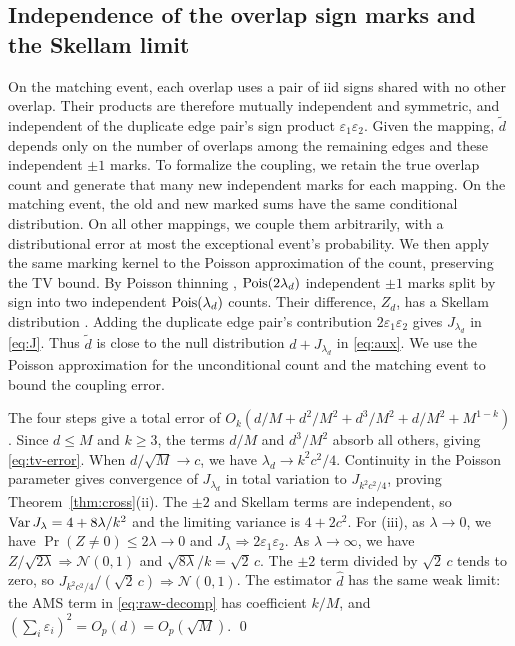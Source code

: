 \subsection{Independence of the overlap sign marks and the Skellam limit}
On the matching event, each overlap uses a pair of iid signs shared with no other overlap. Their products are therefore mutually independent and symmetric, and independent of the duplicate edge pair's sign product $\varepsilon_1\varepsilon_2$. Given the mapping, $\widetilde d$ depends only on the number of overlaps among the remaining edges and these independent $\pm1$ marks. To formalize the coupling, we retain the true overlap count and generate that many new independent marks for each mapping. On the matching event, the old and new marked sums have the same conditional distribution. On all other mappings, we couple them arbitrarily, with a distributional error at most the exceptional event's probability. We then apply the same marking kernel to the Poisson approximation of the count, preserving the TV bound. By Poisson thinning \cite{kingman1993poisson}, $\operatorname{Pois}(2\lambda_d)$ independent $\pm1$ marks split by sign into two independent $\operatorname{Pois}(\lambda_d)$ counts. Their difference, $Z_d$, has a Skellam distribution \cite{skellam1946}. Adding the duplicate edge pair's contribution $2\varepsilon_1\varepsilon_2$ gives $J_{\lambda_d}$ in \eqref{eq:J}. Thus $\widetilde d$ is close to the null distribution $d+J_{\lambda_d}$ in \eqref{eq:aux}. We use the Poisson approximation for the unconditional count and the matching event to bound the coupling error.

The four steps give a total error of $O_k(d/M+d^2/M^2+d^3/M^2+d/M^2+M^{1-k})$. Since $d\le M$ and $k\ge3$, the terms $d/M$ and $d^3/M^2$ absorb all others, giving \eqref{eq:tv-error}. When $d/\sqrt M\to c$, we have $\lambda_d\to k^2c^2/4$. Continuity in the Poisson parameter gives convergence of $J_{\lambda_d}$ in total variation to $J_{k^2c^2/4}$, proving Theorem~\ref{thm:cross}(ii). The $\pm2$ and Skellam terms are independent, so $\operatorname{Var} J_\lambda=4+8\lambda/k^2$ and the limiting variance is $4+2c^2$. For (iii), as $\lambda\to0$, we have $\Pr(Z\ne0)\le2\lambda\to0$ and $J_\lambda\Rightarrow2\varepsilon_1\varepsilon_2$. As $\lambda\to\infty$, we have $Z/\sqrt{2\lambda}\Rightarrow\mathcal N(0,1)$ and $\sqrt{8\lambda}/k=\sqrt2\,c$. The $\pm2$ term divided by $\sqrt2\,c$ tends to zero, so $J_{k^2c^2/4}/(\sqrt2\,c)\Rightarrow\mathcal N(0,1)$. The estimator $\widehat d$ has the same weak limit: the AMS term in \eqref{eq:raw-decomp} has coefficient $k/M$, and $(\sum_i\varepsilon_i)^2=O_p(d)=O_p(\sqrt M)$. \qed

